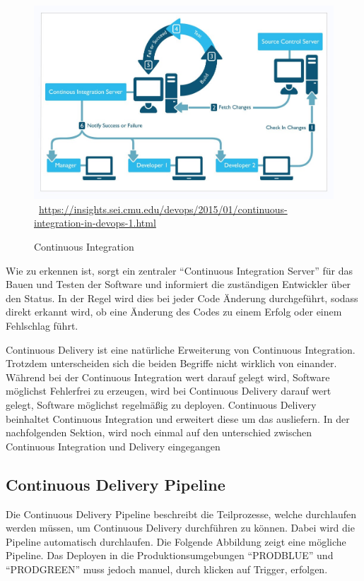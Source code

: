 \begin{figure}[htb]
    \centering 
    \includegraphics[width=\linewidth]{content/images/continuous_integration}\
    \quelle\url{https://insights.sei.cmu.edu/devops/2015/01/continuous-integration-in-devops-1.html}
    \caption[Continuous Integration]{Continuous Integration\\}
    \label{fig:ContinuousIntegration}  
\end{figure}\noindent 
Wie zu erkennen ist, sorgt ein zentraler "`Continuous Integration Server"' für das Bauen und Testen der Software und informiert die zuständigen Entwickler über den Status. In der Regel wird dies bei jeder Code Änderung durchgeführt, sodass direkt erkannt wird, ob eine Änderung des Codes zu einem Erfolg oder einem Fehlschlag führt.

Continuous Delivery ist eine natürliche Erweiterung von Continuous Integration. Trotzdem unterscheiden sich die beiden Begriffe nicht wirklich von einander. Während bei der Continuous Integration wert darauf gelegt wird, Software möglichst Fehlerfrei zu erzeugen, wird bei Continuous Delivery  darauf wert gelegt, Software möglichst regelmäßig zu deployen. Continuous Delivery beinhaltet Continuous Integration und erweitert diese um das ausliefern. In der nachfolgenden Sektion, wird noch einmal auf den unterschied zwischen Continuous Integration und Delivery eingegangen

\subsection{Continuous Delivery Pipeline}
\label{subsec:Continuous Delivery Pipeline}
Die Continuous Delivery Pipeline beschreibt die Teilprozesse, welche durchlaufen werden müssen, um Continuous Delivery durchführen zu können. Dabei wird die Pipeline automatisch durchlaufen. Die Folgende Abbildung zeigt eine mögliche Pipeline. Das Deployen in die Produktionsumgebungen "`PRODBLUE"' und "`PRODGREEN"' muss jedoch manuel, durch klicken auf Trigger, erfolgen.

